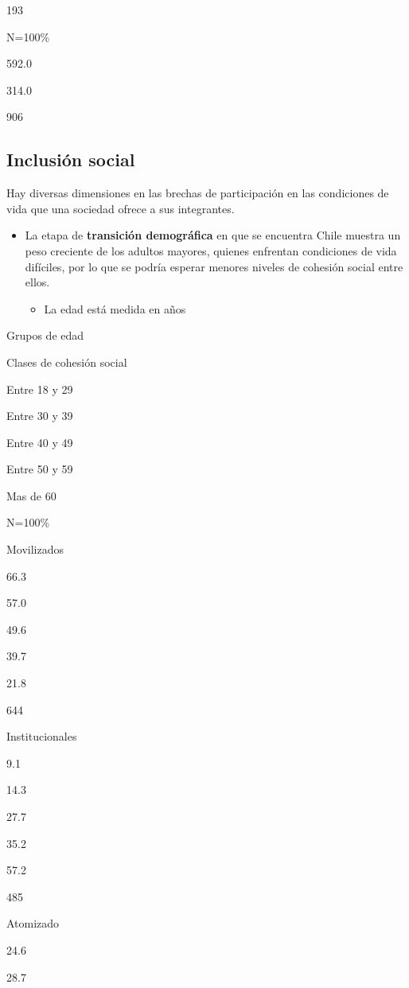 \documentclass[
  12pt,
]{book}
\providecommand{\tightlist}{%
  \setlength{\itemsep}{0pt}\setlength{\parskip}{0pt}}
\begin{document}
193

N=100\%

592.0

314.0

906

\hypertarget{inclusiuxf3n-social}{%
\subsection{Inclusión social}\label{inclusiuxf3n-social}}

Hay diversas dimensiones en las brechas de participación en las condiciones de vida que una sociedad ofrece a sus integrantes.

\begin{itemize}
\tightlist
\item
  La etapa de \textbf{transición demográfica} en que se encuentra Chile muestra un peso creciente de los adultos mayores, quienes enfrentan condiciones de vida difíciles, por lo que se podría esperar menores niveles de cohesión social entre ellos.

  \begin{itemize}
  \tightlist
  \item
    La edad está medida en años
  \end{itemize}
\end{itemize}

Grupos de edad

Clases de cohesión social

Entre 18 y 29

Entre 30 y 39

Entre 40 y 49

Entre 50 y 59

Mas de 60

N=100\%

Movilizados

66.3

57.0

49.6

39.7

21.8

644

Institucionales

9.1

14.3

27.7

35.2

57.2

485

Atomizado

24.6

28.7
\end{document}
